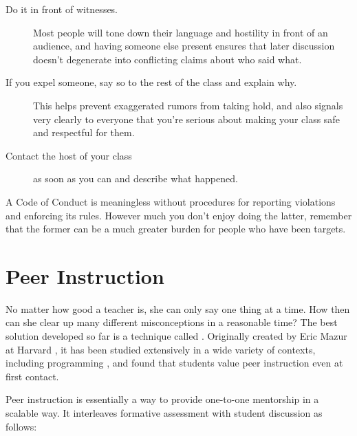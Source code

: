 \begin{description}

\item[Do it in front of witnesses.]
Most people will tone down their language and hostility in front of
an audience, and having someone else present ensures that later
discussion doesn't degenerate into conflicting claims about who said
what.

\item[If you expel someone, say so to the rest of the class and explain why.]
This helps prevent exaggerated rumors from taking hold, and
also signals very clearly to everyone that you're serious about
making your class safe and respectful for them.

\item[Contact the host of your class]
as soon as you can and describe what happened.

\end{description}

A Code of Conduct is meaningless without procedures for reporting
violations and enforcing its rules. However much you don't enjoy doing
the latter, remember that the former can be a much greater burden for
people who have been targets.

\section{Peer Instruction}\label{s:classroom-peer}

No matter how good a teacher is, she can only say one thing at a time.
How then can she clear up many different misconceptions in a reasonable
time? The best solution developed so far is a technique called
. Originally created
by Eric Mazur at Harvard \cite{Mazu1996}, it has been studied
extensively in a wide variety of contexts, including programming
\cite{Crou2001,Port2013}, and \cite{Port2016} found that students
value peer instruction even at first contact.

Peer instruction is essentially a way to provide one-to-one mentorship
in a scalable way. It interleaves formative assessment with student
discussion as follows:

